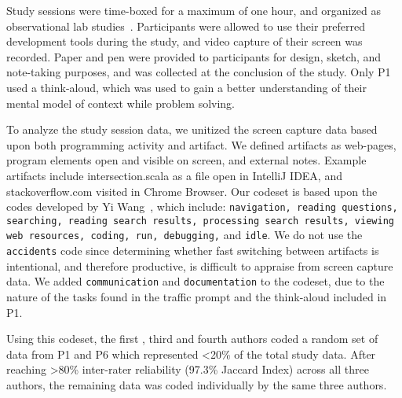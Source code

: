 Study sessions were time-boxed for a maximum of one hour, and organized as observational lab studies~\cite{Easterbrook:2008}. Participants were allowed to use their preferred development tools during the study, and video capture of their screen was recorded. Paper and pen were provided to participants for design, sketch, and note-taking purposes, and was collected at the conclusion of the study. Only P1 used a think-aloud, which was used to gain a better understanding of their mental model of context while problem solving.

To analyze the study session data, we unitized the screen capture data based upon both programming activity and artifact. We defined artifacts as web-pages, program elements open and visible on screen, and external notes. Example artifacts include intersection.scala as a file open in IntelliJ IDEA, and stackoverflow.com visited in Chrome Browser. Our codeset is based upon the codes developed by Yi Wang~\cite{Wang:2017}, which include: \texttt{navigation, reading questions, searching, reading search results, processing search results, viewing web resources, coding, run, debugging,} and \texttt{idle}. We do not use the \texttt{accidents} code since determining whether fast switching between artifacts is intentional, and therefore productive, is difficult to appraise from screen capture data. We added \texttt{communication} and \texttt{documentation} to the codeset, due to the nature of the tasks found in the traffic prompt and the think-aloud included in P1.


Using this codeset, the first , third and fourth authors coded a random set of data from P1 and P6 which represented <20\% of the total study data. After reaching >80\% inter-rater reliability (97.3\% Jaccard Index) across all three authors, the remaining data was coded individually by the same three authors.
